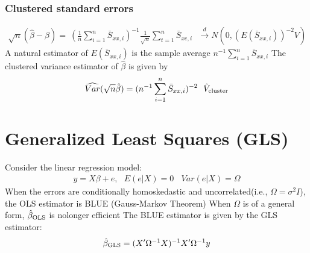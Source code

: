 \documentclass[a4paper,twoside,11pt]{article}
\begin{document}
\subsubsection{Clustered standard errors}
\begin{equation*}
\begin{aligned}
\sqrt{n} (\hat{\beta} - \beta)
=\ (\frac{1}{n} \sum^n_{i=1} \bar S_{xx,i})^{-1} \frac{1}{\sqrt{n}} \sum^n_{t=1} \bar S_{xe,i} \ \ \ \overset{d}{\rightarrow} N(0,(E(\bar S_{xx,i}))^{-2} V)
\end{aligned} 
\end{equation*}
A natural estimator of $E(\bar S_{xx,i})$ is the sample average $n^{-1} \sum^n_{i=1} \bar S_{xx,i}$
\newline
\newline
The \textcolor{NavyBlue}{clustered variance estimator of $\hat{\beta}$} is given by 
\begin{equation*}
\begin{aligned}
\widehat{Var}(\sqrt{n} \hat{\beta} ) = (n^{-1} \sum^n_{i=1} \bar S_{xx,i})^{-2} \ \ \hat{V}_{\textmd{cluster}}
\end{aligned} 
\end{equation*}
\section{Generalized Least Squares (GLS)}
\begin{shaded*}
\noindent Consider the linear regression model: 
\begin{equation*}
\begin{aligned}
y = X \beta + e, \ \ \ E(e|X) =0 \ \ \ \ Var(e|X) = \Omega
\end{aligned} 
\end{equation*}
When the errors are conditionally homoskedastic and uncorrelated(i.e., $\Omega = \sigma^2 I$), the OLS estimator is BLUE (Gauss-Markov Theorem)
\newline
\newline
When $\Omega$ is of a general form, $\hat{\beta}_{\textmd{OLS}}$ is nolonger efficient
\newline
\newline
The BLUE estimator is given by the GLS estimator:
\begin{equation*}
\begin{aligned}
\hat{\beta}_{\textmd{GLS}} = (X' \Omega^{-1} X)^{-1} X' \Omega^{-1} y
\end{aligned} 
\end{equation*}
\end{shaded*}
\end{document}
